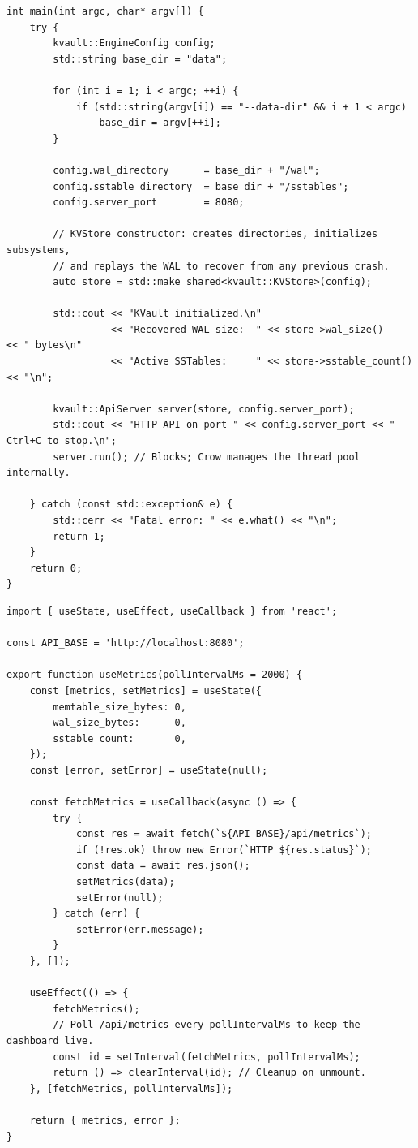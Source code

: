 \documentclass[11pt,a4paper]{article}
\begin{document}
\begin{lstlisting}[style=cpp, caption={Server Entry Point: \texttt{src/main.cpp}}]
int main(int argc, char* argv[]) {
    try {
        kvault::EngineConfig config;
        std::string base_dir = "data";

        for (int i = 1; i < argc; ++i) {
            if (std::string(argv[i]) == "--data-dir" && i + 1 < argc)
                base_dir = argv[++i];
        }

        config.wal_directory      = base_dir + "/wal";
        config.sstable_directory  = base_dir + "/sstables";
        config.server_port        = 8080;

        // KVStore constructor: creates directories, initializes subsystems,
        // and replays the WAL to recover from any previous crash.
        auto store = std::make_shared<kvault::KVStore>(config);

        std::cout << "KVault initialized.\n"
                  << "Recovered WAL size:  " << store->wal_size()     << " bytes\n"
                  << "Active SSTables:     " << store->sstable_count() << "\n";

        kvault::ApiServer server(store, config.server_port);
        std::cout << "HTTP API on port " << config.server_port << " -- Ctrl+C to stop.\n";
        server.run(); // Blocks; Crow manages the thread pool internally.

    } catch (const std::exception& e) {
        std::cerr << "Fatal error: " << e.what() << "\n";
        return 1;
    }
    return 0;
}
\end{lstlisting}

\begin{lstlisting}[style=js, caption={React Metrics Hook: \texttt{dashboard/src/hooks/useMetrics.js}}]
import { useState, useEffect, useCallback } from 'react';

const API_BASE = 'http://localhost:8080';

export function useMetrics(pollIntervalMs = 2000) {
    const [metrics, setMetrics] = useState({
        memtable_size_bytes: 0,
        wal_size_bytes:      0,
        sstable_count:       0,
    });
    const [error, setError] = useState(null);

    const fetchMetrics = useCallback(async () => {
        try {
            const res = await fetch(`${API_BASE}/api/metrics`);
            if (!res.ok) throw new Error(`HTTP ${res.status}`);
            const data = await res.json();
            setMetrics(data);
            setError(null);
        } catch (err) {
            setError(err.message);
        }
    }, []);

    useEffect(() => {
        fetchMetrics();
        // Poll /api/metrics every pollIntervalMs to keep the dashboard live.
        const id = setInterval(fetchMetrics, pollIntervalMs);
        return () => clearInterval(id); // Cleanup on unmount.
    }, [fetchMetrics, pollIntervalMs]);

    return { metrics, error };
}
\end{lstlisting}
\end{document}
